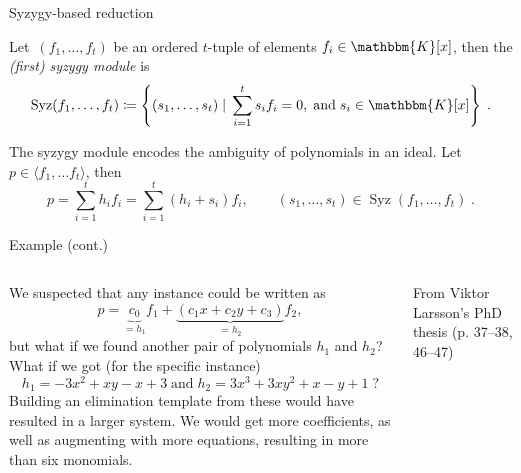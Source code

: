 \documentclass[aspectratio=169]{beamer}
\newcommand{\K}{\ensuremath{\mathbbm{K}}}
\DeclareMathOperator{\syz}{Syz}
\begin{document}
\begin{frame}{Syzygy-based reduction}
\begin{definition}
Let~$(f_1,\ldots,f_t)$ be an ordered $t$-tuple of elements
$f_i\in\K[x]$, then the \emph{(first) syzygy module} is
\begin{equation*}
\syz(f_1,\ldots,f_t) \coloneqq \left\{
    (s_1,\ldots,s_t)\;|\; \sum_{i=1}^t s_if_i=0, \;\mathrm{ and }\; s_i\in\K[x]
\right\}\;.
\end{equation*}
\end{definition}
The syzygy module encodes the ambiguity of polynomials in an ideal.
Let $p\in \langle f_1,\ldots f_t\rangle$, then
\begin{equation*}
    p = \sum_{i=1}^t h_if_i = \sum_{i=1}^t (h_i+s_i)f_i, \qquad (s_1,\ldots,s_t)\in\syz(f_1,\ldots,f_t)\;.
\end{equation*}
\end{frame}

\begin{frame}[t]{Example (cont.)}
\vspace{3mm}
\begin{columns}
    \begin{column}{0.7\textwidth}
        \begin{minipage}[t][\textheight][t]{\textwidth}
        \vspace{4mm}
        We suspected that any instance could be written as
        \begin{equation*}
            p = \underbrace{c_0}_{=h_1}f_1 + \underbrace{(c_1x+c_2y+c_3)}_{=h_2}f_2,
        \end{equation*}
        but what if we found another pair of polynomials $h_1$ and $h_2$? What if we got
        (for the specific instance)
        \[
            h_1=-3x^2+xy-x+3 \;\text{and}\; h_2 = 3x^3+3xy^2+x-y+1\;?
        \]
        Building an elimination template from these would have resulted in a larger system.
        We would get more coefficients, as well as augmenting with more equations, resulting in
        more than six monomials.
        \end{minipage}
    \end{column}%
    \begin{column}{0.3\textwidth}
        \centering
        

        \vspace{5mm}

        {\scriptsize From Viktor Larsson's PhD thesis (p. 37--38, 46--47)}
    \end{column}
\end{columns}
\end{frame}
\end{document}
